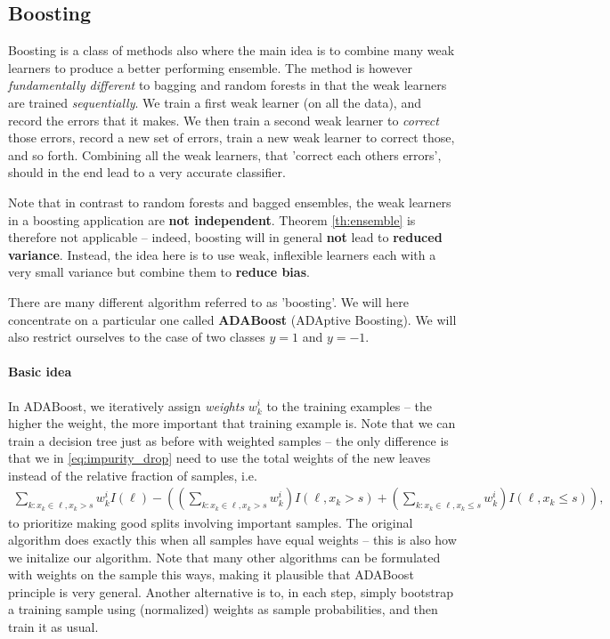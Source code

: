 \documentclass{article}
\begin{document}
\subsection{Boosting} Boosting is a class of methods also where the main idea is to combine many weak learners to produce a better performing ensemble. The method is however \emph{fundamentally different} to bagging and random forests in that the weak learners are trained \emph{sequentially}. We train a first weak learner (on all the data), and record the errors that it makes. We then train a second weak learner to \emph{correct} those errors, record a new set of errors, train a new weak learner to correct those, and so forth. Combining all the weak learners, that 'correct each others errors', should in the end lead to a very accurate classifier.

Note that in contrast to random forests and bagged ensembles, the weak learners in a boosting application are \textbf{not independent}. Theorem \ref{th:ensemble} is therefore not applicable -- indeed, boosting will in general \textbf{not} lead to \textbf{reduced variance}. Instead, the idea here is to use weak, inflexible learners each with a very small variance but combine them to \textbf{reduce bias}. \newline

There are many different algorithm referred to as 'boosting'. We will here concentrate on a particular one called \textbf{ADABoost} (ADAptive Boosting). We will also restrict ourselves to the case of two classes $y=1$ and $y=-1$. 

\paragraph{Basic idea} In ADABoost, we iteratively assign \emph{weights} $w_k^i$ to the training examples -- the higher the weight, the more important that training example is. Note that we can train a decision tree just as before with weighted samples -- the only difference is that we in \eqref{eq:impurity_drop} need to use the total weights of the new leaves instead of the relative fraction of samples, i.e.
\begin{align*}
    \sum_{k: x_k \in \ell, x_k>s}w_k^iI(\ell)  - \left(\left(\sum_{k: x_k \in \ell, x_k>s}w_k^i\right) I(\ell, x_k>s) + \left(\sum_{k: x_k \in \ell, x_k\leq s}w_k^i\right) I(\ell, x_k\leq s)\right),
\end{align*}
to prioritize making good splits involving important samples. The original algorithm does exactly this when all samples have equal weights -- this is also how we initalize our algorithm. Note that many other algorithms can be formulated with weights on the sample this ways, making it plausible that ADABoost principle is very general. Another alternative is to, in each step, simply bootstrap a training sample using (normalized) weights as sample probabilities, and then train it as usual.
\end{document}
